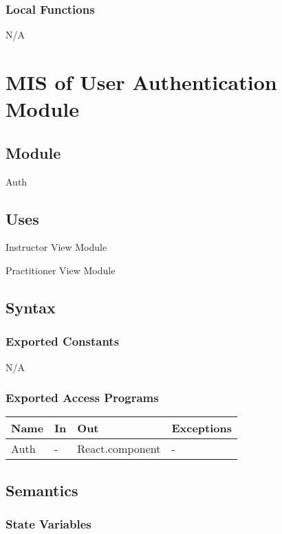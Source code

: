 \documentclass[12pt, titlepage]{article}
\begin{document}
\subsubsection{Local Functions}
N/A

\section{MIS of User Authentication Module} \label{sec:userauth}

\subsection{Module}
Auth

\subsection{Uses}
Instructor View Module

Practitioner View Module

\subsection{Syntax}

\subsubsection{Exported Constants}
N/A

\subsubsection{Exported Access Programs}
\begin{table}[h!]
  \centering
  \begin{tabular}{llll}
    \hline
    \textbf{Name} & \textbf{In} & \textbf{Out}          & \textbf{Exceptions} \\
    \hline
    Auth    & -     & React.component & -             \\
    \hline
  \end{tabular}
\end{table}

\subsection{Semantics}

\subsubsection{State Variables}
\end{document}

